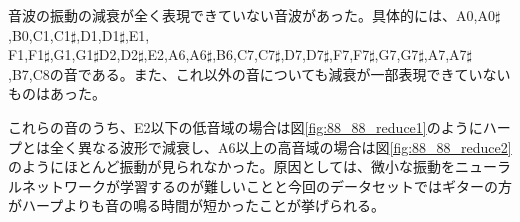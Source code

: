 音波の振動の減衰が全く表現できていない音波があった。具体的には、A0,A0$\sharp$,B0,C1,C1$\sharp$,D1,D1$\sharp$,E1,\\
F1,F1$\sharp$,G1,G1$\sharp$D2,D2$\sharp$,E2,A6,A6$\sharp$,B6,C7,C7$\sharp$,D7,D7$\sharp$,F7,F7$\sharp$,G7,G7$\sharp$,A7,A7$\sharp$,B7,C8の音である。また、これ以外の音についても減衰が一部表現できていないものはあった。

これらの音のうち、E2以下の低音域の場合は図\ref{fig:88_88_reduce1}のようにハープとは全く異なる波形で減衰し、A6以上の高音域の場合は図\ref{fig:88_88_reduce2}のようにほとんど振動が見られなかった。原因としては、微小な振動をニューラルネットワークが学習するのが難しいことと今回のデータセットではギターの方がハープよりも音の鳴る時間が短かったことが挙げられる。